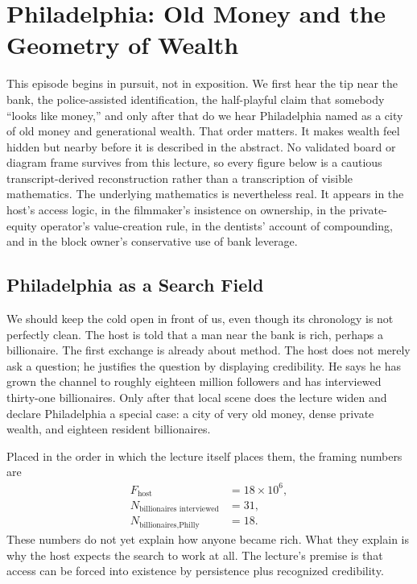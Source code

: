 \chapter{Philadelphia: Old Money and the Geometry of Wealth}

This episode begins in pursuit, not in exposition. We first hear the tip near the bank, the police-assisted identification, the half-playful claim that somebody ``looks like money,'' and only after that do we hear Philadelphia named as a city of old money and generational wealth. That order matters. It makes wealth feel hidden but nearby before it is described in the abstract. No validated board or diagram frame survives from this lecture, so every figure below is a cautious transcript-derived reconstruction rather than a transcription of visible mathematics. The underlying mathematics is nevertheless real. It appears in the host's access logic, in the filmmaker's insistence on ownership, in the private-equity operator's value-creation rule, in the dentists' account of compounding, and in the block owner's conservative use of bank leverage.

\section{Philadelphia as a Search Field}

We should keep the cold open in front of us, even though its chronology is not perfectly clean. The host is told that a man near the bank is rich, perhaps a billionaire. The first exchange is already about method. The host does not merely ask a question; he justifies the question by displaying credibility. He says he has grown the channel to roughly eighteen million followers and has interviewed thirty-one billionaires. Only after that local scene does the lecture widen and declare Philadelphia a special case: a city of very old money, dense private wealth, and eighteen resident billionaires.

Placed in the order in which the lecture itself places them, the framing numbers are
\begin{align}
F_{\text{host}} &= 18 \times 10^6,\\
N_{\text{billionaires interviewed}} &= 31,\\
N_{\text{billionaires,Philly}} &= 18.
\end{align}
These numbers do not yet explain how anyone became rich. What they explain is why the host expects the search to work at all. The lecture's premise is that access can be forced into existence by persistence plus recognized credibility.

